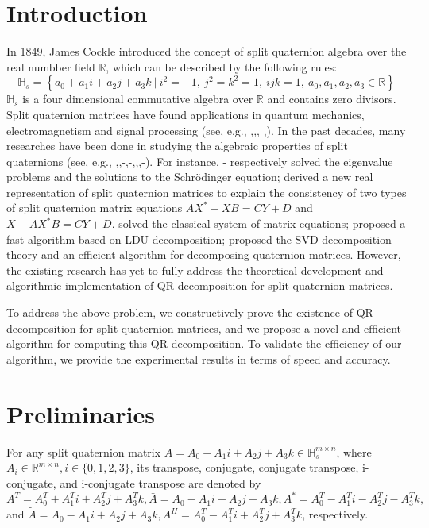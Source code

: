 \documentclass[5p,10pt]{elsarticle}
\numberwithin{equation}{section}
\begin{document}

\section{Introduction}
In 1849, James Cockle \cite{Cockle1849} introduced the concept of split quaternion algebra over the real numbber field $\mathbb{R}$,   which can be described by the following rules:
\begin{equation*}
    \mathbb{H}_s = \left\{ a_0 + a_1 i + a_2 j + a_3 k \ \bigg| \ i^2 = -1,\ j^2 = k^2 = 1,\ ijk = 1,\ a_0, a_1, a_2, a_3 \in \mathbb{R} \right\}
\end{equation*} 
$\mathbb{H}_s$ is a four dimensional commutative algebra over $\mathbb{R}$ and contains zero divisors. 
Split quaternion matrices have found applications in quantum mechanics, electromagnetism and signal processing (see, e.g., \cite{Gog2022},\cite{Hasebe2010},\cite{Le2022},
\cite{Z2022},\cite{Wang2023}). In the past decades, many researches  have been done in studying the algebraic properties of split quaternions (see, e.g., \cite{Abłamowicz2020},\cite{Yasemin2012},\cite{TJiang2015}-\cite{TJiang2018},\cite{Zhuo2020}-\cite{Xin2019},\cite{mma},\cite{wang},\cite{Wang2021}-\cite{Zhang2015}). For instance, \cite{Jiang2018}-\cite{TJiang2018} respectively solved the eigenvalue problems and the solutions to the Schrödinger equation; \cite{Xin2019} derived a new real representation of split quaternion matrices to explain the consistency of two types of split quaternion matrix equations \(AX^* - XB = CY + D\) and \(X - AX^*B = CY + D\).\cite{wang} solved the classical system of matrix equations; \cite{Wang2021} proposed a fast algorithm based on LDU decomposition; \cite{Gang2024}  proposed the SVD decomposition theory and an efficient algorithm for decomposing quaternion matrices. However, the existing research has yet to fully address the theoretical development and algorithmic implementation of QR decomposition for split quaternion matrices.

To address the above problem, we constructively prove the existence of QR decomposition for split quaternion matrices, and we propose a novel and efficient algorithm for computing this QR decomposition.  To validate the efficiency  of our algorithm, we provide the experimental results in terms of speed and accuracy.

\section{Preliminaries}
For any split quaternion matrix \({A}=A_{0}+A_{1}i + A_{2}j + A_{3}k \in\mathbb{H}_{s}^{m\times n}\), where \(A_{i}\in\mathbb{R}^{m\times n}, i\in\{0,1,2,3\}\), its transpose, conjugate, conjugate transpose, i-conjugate, and i-conjugate transpose are  denoted by 
 \({A}^T = A_0^T + A_1^Ti + A_2^Tj + A_3^Tk,\bar{{A}} = A_0 - A_1i - A_2j - A_3k, {A}^* = A_0^T - A_1^Ti - A_2^Tj - A_3^Tk,\) and \(\tilde{{A}} = A_0 - A_1i + A_2j + A_3k,{A}^H = A_0^T - A_1^Ti + A_2^Tj + A_3^Tk\), respectively.
\end{document}
